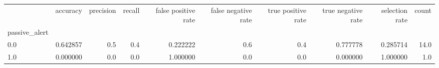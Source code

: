 \begin{tabular}{lrrrrrrrrr}
\toprule
{} &  accuracy &  precision &  recall &  false positive rate &  false negative rate &  true positive rate &  true negative rate &  selection rate &  count \\
passive\_alert &           &            &         &                      &                      &                     &                     &                 &        \\
\midrule
0.0           &  0.642857 &        0.5 &     0.4 &             0.222222 &                  0.6 &                 0.4 &            0.777778 &        0.285714 &   14.0 \\
1.0           &  0.000000 &        0.0 &     0.0 &             1.000000 &                  0.0 &                 0.0 &            0.000000 &        1.000000 &    1.0 \\
\bottomrule
\end{tabular}
